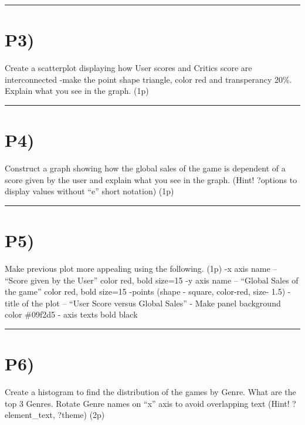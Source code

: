 \documentclass[]{article}
\begin{document}
\begin{center}\rule{0.5\linewidth}{\linethickness}\end{center}

\section{P3)}\label{p3}

Create a scatterplot displaying how User scores and Critics score are
interconnected -make the point shape triangle, color red and
transperancy 20\%. Explain what you see in the graph. (1p)

\begin{center}\rule{0.5\linewidth}{\linethickness}\end{center}

\section{P4)}\label{p4}

Construct a graph showing how the global sales of the game is dependent
of a score given by the user and explain what you see in the graph.
(Hint! ?options to display values without ``e'' short notation) (1p)

\begin{center}\rule{0.5\linewidth}{\linethickness}\end{center}

\section{P5)}\label{p5}

Make previous plot more appealing using the following. (1p) -x axis name
-- ``Score given by the User'' color red, bold size=15 -y axis name --
``Global Sales of the game'' color red, bold size=15 -points (shape -
square, color-red, size- 1.5) -title of the plot -- ``User Score versus
Global Sales'' - Make panel background color \#09f2d5 - axis texts bold
black

\begin{center}\rule{0.5\linewidth}{\linethickness}\end{center}

\section{P6)}\label{p6}

Create a histogram to find the distribution of the games by Genre. What
are the top 3 Genres. Rotate Genre names on ``x'' axis to avoid
overlapping text (Hint! ?element\_text, ?theme) (2p)
\end{document}
